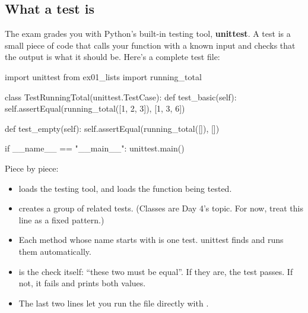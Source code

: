 \documentclass[10pt,a4paper]{article}
\begin{document}
\subsection{What a test is}
The exam grades you with Python’s built-in testing tool, \textbf{unittest}. A test is a small piece of code that calls your function with a known input and checks that the output is what it should be. Here’s a complete test file:
\begin{pycode}
import unittest
from ex01_lists import running_total

class TestRunningTotal(unittest.TestCase):
    def test_basic(self):
        self.assertEqual(running_total([1, 2, 3]), [1, 3, 6])

    def test_empty(self):
        self.assertEqual(running_total([]), [])

if __name__ == "__main__":
    unittest.main()
\end{pycode}
Piece by piece:
\begin{itemize}
\item {} loads the testing tool, and  loads the function being tested.
\item {} creates a group of related tests. (Classes are Day 4’s topic. For now, treat this line as a fixed pattern.)
\item Each method whose name starts with  is one test. unittest finds and runs them automatically.
\item {} is the check itself: “these two must be equal”. If they are, the test passes. If not, it fails and prints both values.
\item The last two lines let you run the file directly with .
\end{itemize}
\end{document}
